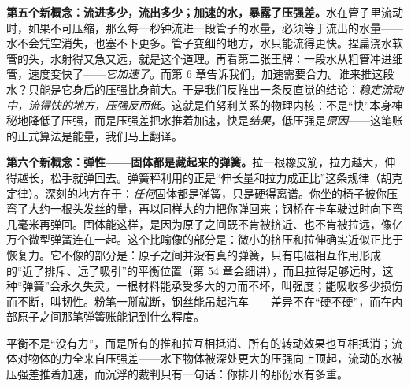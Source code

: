 \begin{mainline}
\textbf{第五个新概念：流进多少，流出多少；加速的水，暴露了压强差。}水在管子里流动时，如果不可压缩，那么每一秒钟流进一段管子的水量，必须等于流出的水量——水不会凭空消失，也塞不下更多。管子变细的地方，水只能流得更快。捏扁浇水软管的头，水射得又急又远，就是这个道理。再看第二张王牌：一段水从粗管冲进细管，速度变快了——\emph{它加速了}。而第 6 章告诉我们，加速需要合力。谁来推这段水？只能是它身后的压强比身前大。于是我们反推出一条反直觉的结论：\emph{稳定流动中，流得快的地方，压强反而低}。这就是伯努利关系的物理内核：不是“快”本身神秘地降低了压强，而是压强差把水推着加速，快是\emph{结果}，低压强是\emph{原因}——这笔账的正式算法是能量，我们马上翻译。

\textbf{第六个新概念：弹性——固体都是藏起来的弹簧。}拉一根橡皮筋，拉力越大，伸得越长，松手就弹回去。弹簧秤利用的正是“伸长量和拉力成正比”这条规律（胡克定律）。深刻的地方在于：\emph{任何}固体都是弹簧，只是硬得离谱。你坐的椅子被你压弯了大约一根头发丝的量，再以同样大的力把你弹回来；钢桥在卡车驶过时向下弯几毫米再弹回。固体能这样，是因为原子之间既不肯被挤近、也不肯被拉远，像亿万个微型弹簧连在一起。这个比喻像的部分是：微小的挤压和拉伸确实近似正比于恢复力。它不像的部分是：原子之间并没有真的弹簧，只有电磁相互作用形成的“近了排斥、远了吸引”的平衡位置（第 54 章会细讲），而且拉得足够远时，这种“弹簧”会永久失灵。一根材料能承受多大的力而不坏，叫强度；能吸收多少损伤而不断，叫韧性。粉笔一掰就断，钢丝能吊起汽车——差异不在“硬不硬”，而在内部原子之间那笔弹簧账能记到什么程度。
\end{mainline}


\begin{oneline}
平衡不是“没有力”，而是所有的推和拉互相抵消、所有的转动效果也互相抵消；流体对物体的力全来自压强差——水下物体被深处更大的压强向上顶起，流动的水被压强差推着加速，而沉浮的裁判只有一句话：你排开的那份水有多重。
\end{oneline}



